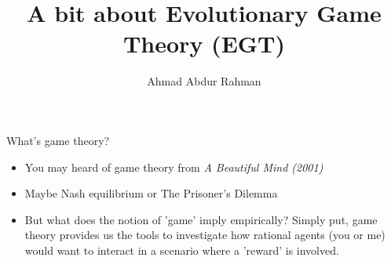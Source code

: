 \documentclass[aspectratio=169, handout]{beamer}
\title{A bit about Evolutionary Game Theory (EGT)}
\author{Ahmad Abdur Rahman}
\date{}
\begin{document}

\begin{frame}
\titlepage
\end{frame}




\begin{frame}{What's game theory?}
    \begin{itemize}
        \item You may heard of game theory from \textit{A Beautiful Mind (2001)}
        \pause
        \item Maybe Nash equilibrium or The Prisoner's Dilemma
        \pause
        \item But what does the notion of 'game' imply empirically?
        \pause Simply put, game theory provides us the tools to investigate how rational agents (you or me) would want to interact in a scenario where a 'reward' is involved.
    \end{itemize}
\end{frame}
\end{document}
